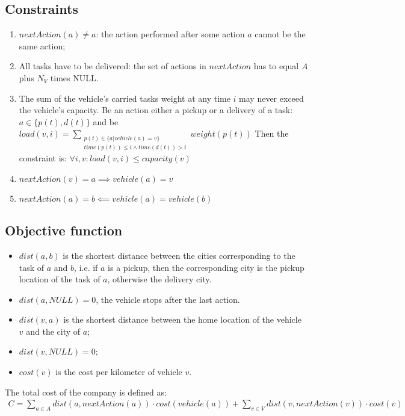 \documentclass[11pt]{article}
\begin{document}
\subsection{Constraints}
\begin{enumerate}
	\item $nextAction(a) \neq a$: the action performed after some action $a$ cannot be the same
	action;
	\item All tasks have to be delivered:
	the set of actions in $nextAction$ has to equal $A$ plus $N_V$ times NULL.
	\item The sum of the vehicle's carried tasks weight at any time $i$ may never exceed the vehicle's capacity.
	Be an action either a pickup or a delivery of a task: $a \in \{p(t),d(t)\}$ and be $load(v,i) = \sum_{\substack{
	p(t) \in \{a|vehicle(a)=v\}\\
   	time(p(t)) \leq i  \wedge  time(d(t))>i}} 
	 weight(p(t))$  	
	Then the constraint is: $\forall i,v: load(v,i) \leq capacity(v) $
	\item $nextAction(v) = a \implies vehicle(a) = v$
	\item $nextAction(a) = b \impliedby vehicle(a) = vehicle(b)$
\end{enumerate}
\subsection{Objective function}
\begin{itemize}
	\item $dist(a,b)$ is the shortest distance between the cities corresponding to the task of $a$ and $b$, i.e.
	if $a$ is a pickup, then the corresponding city is the pickup location of the task of $a$, otherwise the delivery city.
	\item $dist(a, NULL) = 0$, the vehicle stops after the last action.
	\item $dist(v, a)$  is the shortest distance between the home location of the vehicle
	$v$ and the city of $a$;
	\item $dist(v, NULL) = 0$;
	\item $cost(v)$ is the cost per kilometer of vehicle $v$.
\end{itemize}
The total cost of the company is defined as:
\begin{align*}
	C = \sum_{a \in A} dist(a, nextAction(a)) \cdot cost(vehicle(a)) + \sum_{v \in V} dist(v, nextAction(v)) \cdot cost(v)
\end{align*}
\end{document}
